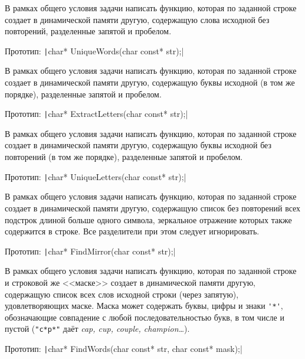 \begin{zztask}
В рамках общего условия задачи написать функцию, которая по заданной строке
создает в динамической памяти другую, содержащую слова исходной без
повторений, разделенные запятой и пробелом.

Прототип: \texttt|char* UniqueWords(char const* str);|
\end{zztask}

\begin{zztask}
В рамках общего условия задачи написать функцию, которая по заданной строке
создает в динамической памяти другую, содержащую буквы исходной (в том же
порядке), разделенные запятой и пробелом.

Прототип: \texttt|char* ExtractLetters(char const* str);|
\end{zztask}

\begin{zztask}
В рамках общего условия задачи написать функцию, которая по заданной строке
создает в динамической памяти другую, содержащую буквы исходной без
повторений (в том же порядке), разделенные запятой и пробелом.

Прототип: \texttt|char* UniqueLetters(char const* str);|
\end{zztask}

\begin{zztask}
В рамках общего условия задачи написать функцию, которая по заданной строке
создает в динамической памяти другую, содержащую список без повторений всех
подстрок длиной больше одного символа, зеркальное отражение которых также
содержится в строке. Все разделители при этом следует игнорировать.

Прототип: \texttt|char* FindMirror(char const* str);|
\end{zztask}

\begin{zztask}
В рамках общего условия задачи написать функцию, которая по заданной строке
и строковой же <<маске>> создает в динамической памяти другую, содержащую список
всех слов исходной строки (через запятую), удовлетворяющих маске. Маска может
содержать буквы, цифры и знаки \verb|'*'|, обозначающие совпадение с любой
последовательностью букв, в том числе и пустой (\verb|"c*p*"| даёт
\textit{cap, cup, couple, champion\dots}).

Прототип: \texttt|char* FindWords(char const* str, char const* mask);|
\end{zztask}

